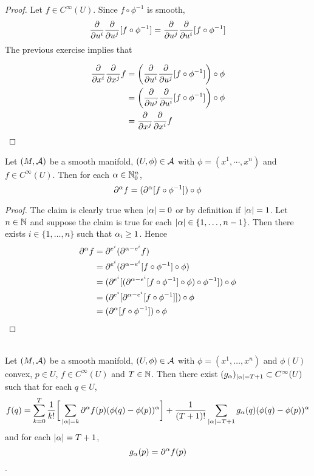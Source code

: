 \documentclass{book}
\begin{document}
\begin{proof}
	Let $f \in C^{\infty}(U)$. Since $f \circ \phi^{-1}$ is smooth, $$\frac{\partial}{\partial u^i} \frac{\partial}{\partial u^j} [f \circ \phi^{-1}] = \frac{\partial}{\partial u^j} \frac{\partial}{\partial u^i} [f \circ \phi^{-1}] $$
	The previous exercise implies that 
	
	\begin{align*}
		\frac{\partial}{\partial x^i}\frac{\partial}{\partial x^j}f 
		&= \bigg( \frac{\partial}{\partial u^i} \frac{\partial}{\partial u^j} [f \circ \phi^{-1}]  \bigg) \circ \phi \\
		&= \bigg( \frac{\partial}{\partial u^j} \frac{\partial}{\partial u^i} [f \circ \phi^{-1}]  \bigg) \circ \phi \\
		&=\frac{\partial}{\partial x^j}\frac{\partial}{\partial x^i}f 
	\end{align*}
\end{proof}

\begin{ex}  
	Let $(M, \mathcal{A})$ be a smooth manifold, $(U, \phi) \in \mathcal{A}$ with $\phi = (x^1, \cdots, x^n)$ and $f \in C^{\infty}(U)$. Then for each $\alpha \in \mathbb{N}_0^n$, $$\partial^{\alpha} f = (\partial^{\alpha}[ f \circ \phi^{-1}] ) \circ \phi$$
\end{ex}	

\begin{proof}
	The claim is clearly true when $|\alpha| =0$ or by definition if $|\alpha| = 1$. Let $n \in \mathbb{N}$ and suppose the claim is true for each $|\alpha| \in \{1, \ldots, n-1 \}$. Then there exists $i \in \{1, \ldots, n\}$ such that $\alpha_i \geq 1$. Hence 
	\begin{align*}
		\partial^{\alpha}f 
		&= \partial^{e^i} (\partial^{\alpha - e^i} f) \\
		&= \partial^{e^i} (\partial^{\alpha - e^i}[ f \circ \phi^{-1}] \circ \phi) \\
		&= (\partial^{e^i} [(\partial^{\alpha - e^i}[ f \circ \phi^{-1}] \circ \phi) \circ \phi^{-1} ]) \circ \phi\\
		&= (\partial^{e^i} [\partial^{\alpha - e^i}[ f \circ \phi^{-1}]] )\circ \phi\\
		&= (\partial^{\alpha}[ f \circ \phi^{-1}] )\circ \phi\\
	\end{align*}
\end{proof}


\begin{ex}   \\
	Let $(M, \mathcal{A})$ be a smooth manifold, $(U, \phi) \in \mathcal{A}$ with $\phi = (x^1, \ldots, x^n)$ and $\phi(U)$ convex, $p \in U$, $f \in C^{\infty}(U)$ and $T \in \mathbb{N}$. Then there exist $(g_{\alpha})_{|\alpha| = T+1} \subset C^{\infty}(U)$ such that for each $q \in U$,
	$$f(q) = \sum_{k=0}^{T} \frac{1}{k!} \bigg[\sum_{|\alpha| = k} \partial^{\alpha} f (p) ( \phi(q) - \phi(p))^{\alpha} \bigg] + \frac{1}{(T+1)!} \sum_{|\alpha| = T+1} g_{\alpha}(q) (\phi(q) - \phi(p))^{\alpha} $$ and for each $|\alpha|= T+1$, $$g_{\alpha}(p) = \partial^{\alpha} f(p)$$
	.
\end{ex}
\end{document}
